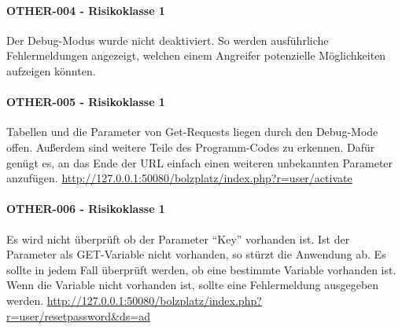 \paragraph{OTHER-004 - Risikoklasse 1}
Der Debug-Modus wurde nicht deaktiviert. So werden ausführliche Fehlermeldungen angezeigt, welchen einem Angreifer potenzielle Möglichkeiten aufzeigen könnten.


\paragraph{OTHER-005 - Risikoklasse 1}
Tabellen und die Parameter von Get-Requests liegen durch den Debug-Mode offen. Außerdem sind weitere Teile des Programm-Codes zu erkennen. Dafür genügt es, an das Ende der URL einfach einen weiteren unbekannten Parameter anzufügen.
\url{http://127.0.0.1:50080/bolzplatz/index.php?r=user/activate}


\clearpage
\paragraph{OTHER-006 - Risikoklasse 1}
Es wird nicht überprüft ob der Parameter “Key” vorhanden ist. Ist der Parameter als GET-Variable nicht vorhanden, so stürzt die Anwendung ab. Es sollte in jedem Fall überprüft werden, ob eine bestimmte Variable vorhanden ist. Wenn die Variable nicht vorhanden ist, sollte eine Fehlermeldung ausgegeben werden. \url{http://127.0.0.1:50080/bolzplatz/index.php?r=user/resetpassword&ds=ad}
